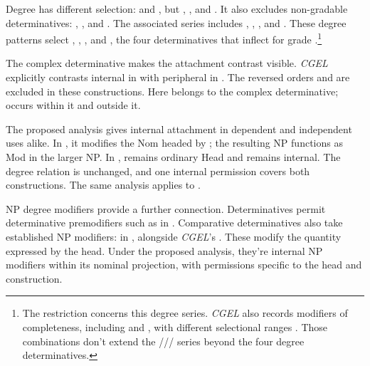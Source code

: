 \documentclass[12pt]{article}
\begin{document}
Degree  has different selection:  and , but , , and . It also excludes non-gradable determinatives: , , and . The associated series includes , , , and . These degree patterns select , , , and , the four determinatives that inflect for grade \citep[393--395, 431--432]{huddleston2002}.\footnote{The restriction concerns this degree series. \textit{CGEL} also records modifiers of completeness, including  and , with different selectional ranges \citep[432]{huddleston2002}. Those combinations don't extend the /// series beyond the four degree determinatives.}

The complex determinative  makes the attachment contrast visible. \textit{CGEL} explicitly contrasts internal  in  with peripheral  in  \citep[p.~392, (61)]{huddleston2002}. The reversed orders  and  are excluded in these constructions. Here  belongs to the complex determinative;  occurs within it and  outside it.

The proposed analysis gives  internal attachment in dependent and independent uses alike. In , it modifies the Nom headed by ; the resulting  NP functions as Mod in the larger NP. In ,  remains ordinary Head and  remains internal. The degree relation is unchanged, and one internal permission covers both constructions. The same analysis applies to .

NP degree modifiers provide a further connection. Determinatives permit determinative premodifiers such as  in  \citep[393]{huddleston2002}. Comparative determinatives also take established NP modifiers:  in , alongside \textit{CGEL}'s  \citep[432]{huddleston2002}. These modify the quantity expressed by the head. Under the proposed analysis, they're internal NP modifiers within its nominal projection, with permissions specific to the head and construction.
\end{document}
